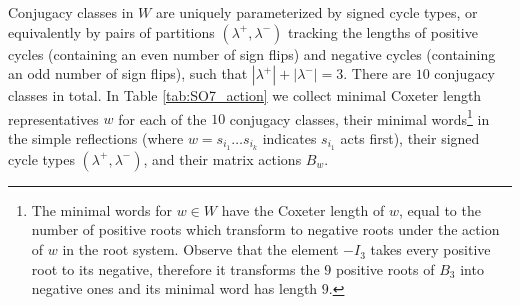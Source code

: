 \documentclass[11pt,english]{amsart}
\numberwithin{equation}{section}
\numberwithin{figure}{section}
\theoremstyle{plain}
\theoremstyle{plain}
\theoremstyle{definition}
\theoremstyle{remark}
\begin{document}
Conjugacy classes in $W$ are uniquely parameterized by signed cycle types, or equivalently by pairs of partitions $(\lambda^+, \lambda^-)$ tracking the lengths of positive cycles (containing an even number of sign flips) and negative cycles (containing an odd number of sign flips), such that $|\lambda^+| + |\lambda^-| = 3$. There are $10$ conjugacy classes in total. In Table \ref{tab:SO7_action}  we collect minimal Coxeter length representatives $w$ for each of the $10$ conjugacy classes, their minimal words\footnote{The minimal words for $w\in W$ have the Coxeter length of $w$, equal to the number of positive roots which transform to negative roots under the action of $w$ in the root system. Observe that the element $-I_3$ takes every positive root to its negative, therefore it transforms the $9$ positive roots of $B_3$ into negative ones and its minimal word has length $9$.} in the simple reflections (where $w = s_{i_1} \dots s_{i_k}$ indicates $s_{i_1}$ acts first), their signed cycle types $(\lambda^+, \lambda^-)$, and their matrix actions $B_w$.
\end{document}
